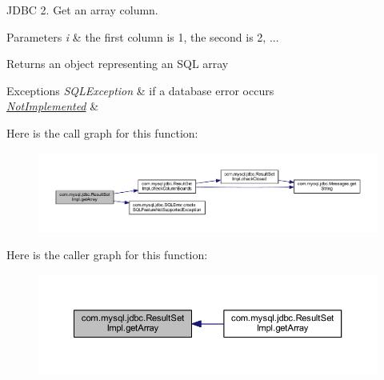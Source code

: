 J\+D\+BC 2. Get an array column.


\begin{DoxyParams}{Parameters}
{\em i} & the first column is 1, the second is 2, ...\\
\hline
\end{DoxyParams}
\begin{DoxyReturn}{Returns}
an object representing an S\+QL array
\end{DoxyReturn}

\begin{DoxyExceptions}{Exceptions}
{\em S\+Q\+L\+Exception} & if a database error occurs \\
\hline
{\em \mbox{\hyperlink{classcom_1_1mysql_1_1jdbc_1_1_not_implemented}{Not\+Implemented}}} & \\
\hline
\end{DoxyExceptions}
Here is the call graph for this function\+:
\nopagebreak
\begin{figure}[H]
\begin{center}
\leavevmode
\includegraphics[width=350pt]{classcom_1_1mysql_1_1jdbc_1_1_result_set_impl_a6b06205205974e4964705258ce1c90df_cgraph}
\end{center}
\end{figure}
Here is the caller graph for this function\+:
\nopagebreak
\begin{figure}[H]
\begin{center}
\leavevmode
\includegraphics[width=350pt]{classcom_1_1mysql_1_1jdbc_1_1_result_set_impl_a6b06205205974e4964705258ce1c90df_icgraph}
\end{center}
\end{figure}
\mbox{\label{classcom_1_1mysql_1_1jdbc_1_1_result_set_impl_a47d8389da497a88335d4ef11c611e8f7}} 
